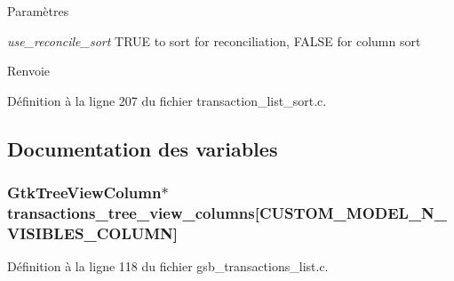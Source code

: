 \begin{DoxyParams}{Paramètres}
\item[{\em use\_\-reconcile\_\-sort}]TRUE to sort for reconciliation, FALSE for column sort\end{DoxyParams}
\begin{DoxyReturn}{Renvoie}

\end{DoxyReturn}


Définition à la ligne 207 du fichier transaction\_\-list\_\-sort.c.



\subsection{Documentation des variables}
\subsubsection[{transactions\_\-tree\_\-view\_\-columns}]{\setlength{\rightskip}{0pt plus 5cm}GtkTreeViewColumn$\ast$ {\bf transactions\_\-tree\_\-view\_\-columns}[CUSTOM\_\-MODEL\_\-N\_\-VISIBLES\_\-COLUMN]}\label{transaction__list__sort_8c_a4f11139c6cd90bf0cd17d761652b069b}


Définition à la ligne 118 du fichier gsb\_\-transactions\_\-list.c.

